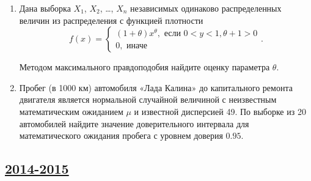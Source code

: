 \begin{enumerate}
\item  Дана выборка $X_1$, $X_2$, \ldots, $X_n$ независимых одинаково распределенных
величин из распределения с функцией плотности
\[
f(x)=\begin{cases}
(1+\theta)x^\theta, \text{ если } 0<y<1, \theta+1>0 \\
0, \text{ иначе}
\end{cases}.
\]

Методом максимального правдоподобия найдите оценку параметра $\theta$.

\item Пробег (в 1000 км) автомобиля «Лада Калина» до капитального ремонта двигателя
является нормальной случайной величиной с неизвестным математическим ожиданием $\mu$
и известной дисперсией 49. По выборке из 20 автомобилей найдите значение доверительного
интервала для математического ожидания пробега с уровнем доверия $0.95$.
\end{enumerate}


\newpage
\subsection[2014-2015]{\hyperref[sec:sol_kr_03_2014_2015]{2014-2015}}
\label{sec:kr_03_2014_2015}

